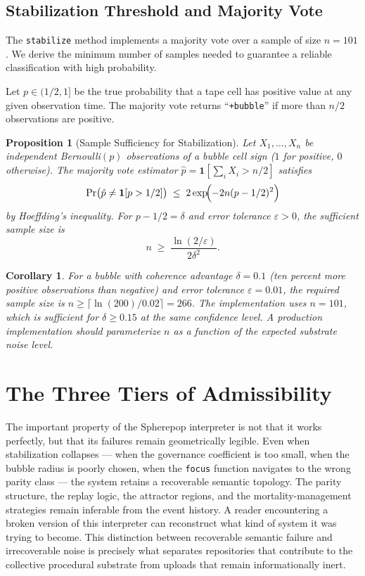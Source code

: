 \documentclass[11pt]{article}
\newtheorem{proposition}[theorem]{Proposition}
\newtheorem{corollary}[theorem]{Corollary}
\begin{document}
\subsection*{Stabilization Threshold and Majority Vote}

The \texttt{stabilize} method implements a majority vote over a sample of size
$n = 101$. We derive the minimum number of samples needed to guarantee a
reliable classification with high probability.

Let $p \in (1/2, 1]$ be the true probability that a tape cell has positive
value at any given observation time. The majority vote returns ``\texttt{+bubble}''
if more than $n/2$ observations are positive.

\begin{proposition}[Sample Sufficiency for Stabilization]
Let $X_1, \ldots, X_n$ be independent Bernoulli$(p)$ observations of a bubble
cell sign ($1$ for positive, $0$ otherwise). The majority vote estimator
$\hat{p} = \mathbf{1}[\sum_i X_i > n/2]$ satisfies
\[
\Pr\bigl(\hat{p} \neq \mathbf{1}[p > 1/2]\bigr)
\;\leq\; 2\exp\!\Bigl(-2n(p - 1/2)^2\Bigr)
\]
by Hoeffding's inequality. For $p - 1/2 = \delta$ and error tolerance
$\varepsilon > 0$, the sufficient sample size is
\[
n \;\geq\; \frac{\ln(2/\varepsilon)}{2\delta^2}.
\]
\end{proposition}

\begin{corollary}
For a bubble with coherence advantage $\delta = 0.1$ (ten percent more positive
observations than negative) and error tolerance $\varepsilon = 0.01$, the
required sample size is $n \geq \lceil \ln(200)/0.02 \rceil = 266$. The
implementation uses $n = 101$, which is sufficient for $\delta \geq 0.15$
at the same confidence level. A production implementation should parameterize
$n$ as a function of the expected substrate noise level.
\end{corollary}

\section{The Three Tiers of Admissibility}

The important property of the Spherepop interpreter is not that it works
perfectly, but that its failures remain geometrically legible. Even when
stabilization collapses --- when the governance coefficient is too small, when
the bubble radius is poorly chosen, when the \texttt{focus} function navigates
to the wrong parity class --- the system retains a recoverable semantic
topology. The parity structure, the replay logic, the attractor regions, and
the mortality-management strategies remain inferable from the event history. A
reader encountering a broken version of this interpreter can reconstruct what
kind of system it was trying to become. This distinction between recoverable
semantic failure and irrecoverable noise is precisely what separates repositories
that contribute to the collective procedural substrate from uploads that remain
informationally inert.
\end{document}
